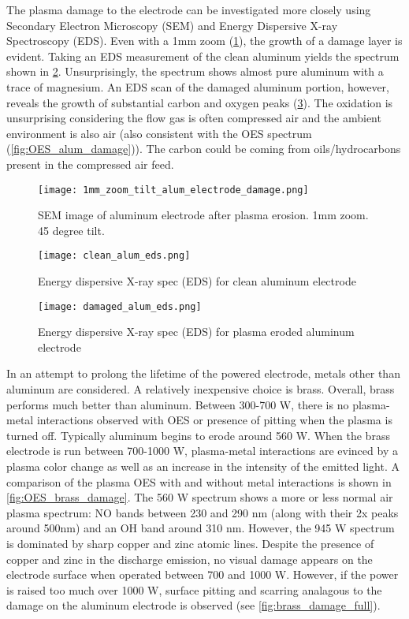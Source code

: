 The plasma damage to the electrode can be investigated more closely using Secondary Electron Microscopy (SEM) and Energy Dispersive X-ray Spectroscopy (EDS). Even with a 1mm zoom (\cref{fig:alum_damage_1mm}), the growth of a damage layer is evident. Taking an EDS measurement of the clean aluminum yields the spectrum shown in \cref{fig:EDS_clean_alum}. Unsurprisingly, the spectrum shows almost pure aluminum with a trace of magnesium. An EDS scan of the damaged aluminum portion, however, reveals the growth of substantial carbon and oxygen peaks (\cref{fig:EDS_damaged_alum}). The oxidation is unsurprising considering the flow gas is often compressed air and the ambient environment is also air (also consistent with the OES spectrum (\cref{fig:OES_alum_damage})). The carbon could be coming from oils/hydrocarbons present in the compressed air feed.

\begin{figure}[htbp]
  \centering
  \texttt{[image: 1mm\_zoom\_tilt\_alum\_electrode\_damage.png]}
  \caption{SEM image of aluminum electrode after plasma erosion. 1mm zoom. 45 degree tilt.}
  \label{fig:alum_damage_1mm}
\end{figure}

\begin{figure}[htbp]
  \centering
  \texttt{[image: clean\_alum\_eds.png]}
  \caption{Energy dispersive X-ray spec (EDS) for clean aluminum electrode}
  \label{fig:EDS_clean_alum}
\end{figure}

\begin{figure}[htbp]
  \centering
  \texttt{[image: damaged\_alum\_eds.png]}
  \caption{Energy dispersive X-ray spec (EDS) for plasma eroded aluminum electrode}
  \label{fig:EDS_damaged_alum}
\end{figure}

In an attempt to prolong the lifetime of the powered electrode, metals other than aluminum are considered. A relatively inexpensive choice is brass. Overall, brass performs much better than aluminum. Between 300-700 W, there is no plasma-metal interactions observed with OES or presence of pitting when the plasma is turned off. Typically aluminum begins to erode around 560 W. When the brass electrode is run between 700-1000 W, plasma-metal interactions are evinced by a plasma color change as well as an increase in the intensity of the emitted light. A comparison of the plasma OES with and without metal interactions is shown in \cref{fig:OES_brass_damage}. The 560 W spectrum shows a more or less normal air plasma spectrum: NO bands between 230 and 290 nm (along with their 2x peaks around 500nm) and an OH band around 310 nm. However, the 945 W spectrum is dominated by sharp copper and zinc atomic lines. Despite the presence of copper and zinc in the discharge emission, no visual damage appears on the electrode surface when operated between 700 and 1000 W. However, if the power is raised too much over 1000 W, surface pitting and scarring analagous to the damage on the aluminum electrode is observed (see \cref{fig:brass_damage_full}).


